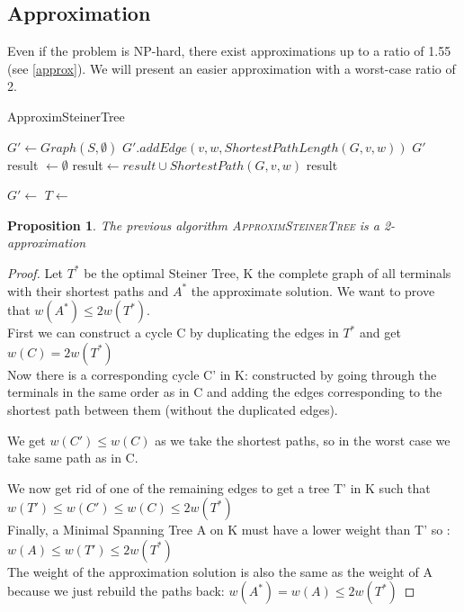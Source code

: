 \documentclass{article}
\newtheorem{prop}{Proposition}
\begin{document}
\subsection{Approximation}
Even if the problem is NP-hard, there exist approximations up to a ratio of 1.55 (see \ref{approx}). We will present an easier approximation with a worst-case ratio of 2.

\begin{algorithm}
\caption{ApproximSteinerTree}
\begin{algorithmic}
        \State $G' \gets Graph(S, \emptyset)$
                \State $G'.addEdge(v,w, ShortestPathLength(G,v,w))$
            \EndFor
        \EndFor
        \State \Return $G'$
    \EndFunction\\
        \State result $\gets \emptyset$
            \State result$ \gets result \cup ShortestPath(G,v,w)$
        \EndFor
        \State \Return result
    \EndFunction\\

    \State $G' \gets$ 
    \State $T \gets$ 
    \State \Return {}

    \EndFunction
\end{algorithmic}
\end{algorithm}
    
\begin{prop}
    The previous algorithm \textsc{ApproximSteinerTree} is a 2-approximation
\end{prop}

\begin{proof}
    Let $T^*$ be the optimal Steiner Tree, K the complete graph of all terminals with their shortest paths and $A^*$ the approximate solution. We want to prove that $w(A^*) \leq 2w(T^*)$. \\
    First we can construct a cycle C by duplicating the edges in $T^*$ and get $w(C) = 2w(T^*)$\\
    
    Now there is a corresponding cycle C' in K: 
    constructed by going through the terminals in the same order as in C and adding the edges corresponding to the shortest path between them
    (without the duplicated edges).
    
    We get $w(C') \leq w(C)$ as we take the shortest paths, so in the worst case we take same path as in C.
    
    We now get rid of one of the remaining edges to get a tree T' in K such that $w(T') \leq w(C') \leq w(C) \leq 2w(T^*)$ \\
   
   Finally, a Minimal Spanning Tree A on K must have a lower weight than T' so :
    $w(A) \leq w(T') \leq 2w(T^*)$\\
   
   The weight of the approximation solution is also the same as the weight of A because we just rebuild the paths back:
    $w(A^*) = w(A) \leq 2w(T^*)$
\end{proof}
\end{document}

